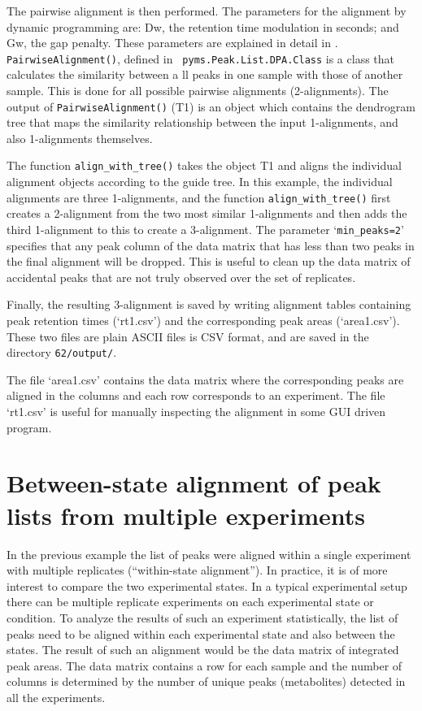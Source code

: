 The pairwise alignment is then performed.  The parameters for the alignment by
dynamic programming are: Dw, the retention time modulation in seconds; and Gw,
the gap penalty.  These parameters are explained in detail in
\cite{Robinson07}.  {\tt PairwiseAlignment()}, defined in {\tt
pyms.Peak.List.DPA.Class} is a class that calculates the similarity between a
ll peaks in one sample with those of another sample.  This is done for all
possible pairwise alignments (2-alignments). The output of
{\tt PairwiseAlignment()} (T1) is an object which contains the dendrogram tree
that maps the similarity relationship between the input 1-alignments, and also
1-alignments themselves.

The function {\tt align\_with\_tree()} takes the object
T1 and aligns the individual alignment objects according to
the guide tree.  In this example, the individual alignments are
three 1-alignments, and the function {\tt align\_with\_tree()} first
creates a 2-alignment from the two most similar 1-alignments
and then adds the third 1-alignment to this to create a
3-alignment. The parameter `{\tt min\_peaks=2}' specifies that any peak
column of the data matrix that has less than two peaks in the final
alignment will be dropped.  This is useful to clean up the data
matrix of accidental peaks that are not truly observed over the
set of replicates.

Finally, the resulting 3-alignment is saved by writing alignment tables
containing peak retention times (`rt1.csv') and the corresponding peak areas
(`area1.csv'). These two files are plain ASCII files is CSV format, and are
saved in the directory {\tt 62/output/}.

\noindent
The file `area1.csv' contains the data matrix where the corresponding peaks are
aligned in the columns and each row corresponds to an experiment. The file
`rt1.csv' is useful for manually inspecting the alignment in some GUI driven
program.

\section{Between-state alignment of peak lists from multiple experiments}


In the previous example the list of peaks were aligned within a single
experiment with multiple replicates (``within-state alignment'').  In practice,
it is of more interest to compare the two experimental states. In a typical
experimental setup there can be multiple replicate experiments on each
experimental state or condition. To analyze the results of such an experiment
statistically, the list of peaks need to be aligned within each
experimental state and also between the states. The result of such an alignment
would be the data matrix of integrated peak areas. The data matrix contains
 a row for each sample and the number of columns is determined by
the number of unique peaks (metabolites) detected in all the experiments.


